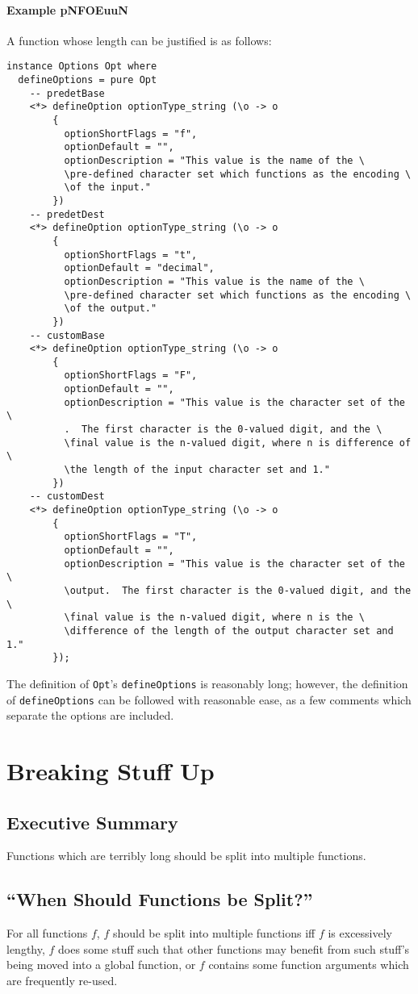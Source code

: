 \documentclass{report}
\begin{document}
\subsubsection{Example pNFOEuuN}
A function whose length can be justified is as follows:
\begin{lstlisting}
instance Options Opt where
  defineOptions = pure Opt
    -- predetBase
    <*> defineOption optionType_string (\o -> o
        {
          optionShortFlags = "f",
          optionDefault = "",
          optionDescription = "This value is the name of the \
          \pre-defined character set which functions as the encoding \
          \of the input."
        })
    -- predetDest
    <*> defineOption optionType_string (\o -> o
        {
          optionShortFlags = "t",
          optionDefault = "decimal",
          optionDescription = "This value is the name of the \
          \pre-defined character set which functions as the encoding \
          \of the output."
        })
    -- customBase
    <*> defineOption optionType_string (\o -> o
        {
          optionShortFlags = "F",
          optionDefault = "",
          optionDescription = "This value is the character set of the \
          .  The first character is the 0-valued digit, and the \
          \final value is the n-valued digit, where n is difference of \
          \the length of the input character set and 1."
        })
    -- customDest
    <*> defineOption optionType_string (\o -> o
        {
          optionShortFlags = "T",
          optionDefault = "",
          optionDescription = "This value is the character set of the \
          \output.  The first character is the 0-valued digit, and the \
          \final value is the n-valued digit, where n is the \
          \difference of the length of the output character set and 1."
        });
\end{lstlisting}
The definition of \texttt{Opt}'s \texttt{defineOptions} is reasonably long; however, the definition of \texttt{defineOptions} can be followed with reasonable ease, as a few comments which separate the options are included.
\chapter{Breaking Stuff Up}
\section{Executive Summary}
Functions which are terribly long should be split into multiple functions.
\section{``When Should Functions be Split?''}
For all functions $f$, $f$ should be split into multiple functions iff $f$ is excessively lengthy, $f$ does some stuff such that other functions may benefit from such stuff's being moved into a global function, or $f$ contains some function arguments which are frequently re-used.
\end{document}

